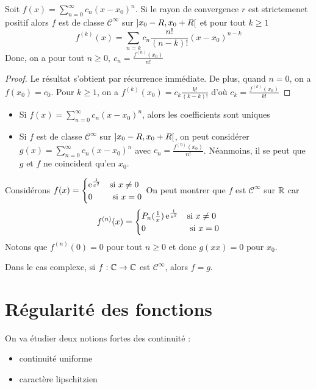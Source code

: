 \begin{corollaire}
    Soit $f(x) = \sum_{n = 0}^\infty c_n(x-x_0)^n$. Si le rayon de convergence $r$ est strictemenet positif alors $f$ est de classe $\mathcal C^\infty$ sur $\left] x_0 - R, x_0 + R\right[$ et pour tout $k\ge 1$ $$f^{(k)}(x) = \sum_{ n = k}c_n\frac{n!}{(n-k)!}(x-x_0)^{n-k}$$
    Donc, on a pour tout $n\ge 0,\ c_n = \frac{f^{(n)}(x_0)}{n!}$
\end{corollaire}
\begin{proof}
    Le résultat s'obtient par récurrence immédiate. De plus, quand $n = 0$, on a $f(x_0) = c_0$. 
    Pour $k\ge 1$, on a $f^{(k)}(x_0) = c_k \frac{k!}{(k-k)!}$ d'où $c_k = \frac{f^{(k)}(x_0)}{k!}$
\end{proof}
\begin{remarque}
    \begin{itemize}
        \item Si $f(x)= \sum_{ n = 0}^\infty c_n(x-x_0)^n$, alors les coefficients sont uniques
        \item Si $f$ est de classe $\mathcal C^\infty$ sur $\left] x_0 - R, x_0 + R\right[$, on peut considérer $g(x) = \sum_{n = 0}^\infty c_n(x-x_0)^n$ avec $c_n =  \frac{f^{(n)}(x_0)}{n!}$. 
        Néanmoins, il se peut que $g$ et $f$ ne coïncident qu'en $x_0$.
    \end{itemize}
\end{remarque}
\begin{exemple}
    Considérons $f(x) = \begin{cases}
        \operatorname{e} ^{\frac{1}{x^2}} & \text{si $x\ne 0$}\\
        0 &\text{ si $x=0$}
    \end{cases}$
    On peut montrer que $f$ est $\mathcal C^\infty$ sur $\mathbb{R}$ car $$f^{(n)}(x) = \begin{cases}
       P_n(\frac{1}{x}) \operatorname{e} ^{\frac{1}{x^2}} & \text{si $x\ne 0$}\\
        0 &\text{ si $x=0$}
        \end{cases}$$
        Notons que $f^{(n)}(0) = 0$ pour tout $n\ge 0$ et donc $g(xx) = 0$ pour $x_0$.
\end{exemple}
\begin{remarque}
    Dans le cas complexe, si $f:\mathbb{C}\to \mathbb{C}$ est $\mathcal C^\infty$, alors $f = g$.
\end{remarque}
\chapter{Régularité des fonctions}
On va étudier deux notions fortes des continuité :
\begin{itemize}
    \item continuité uniforme
    \item caractère lipschitzien
\end{itemize}
